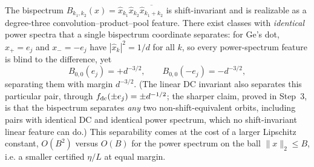 \begin{proposition}
\label{prop:bispectrum}
The bispectrum $B_{k_1,k_2}(x) = \hat x_{k_1}\hat x_{k_2}\overline{\hat x_{k_1+k_2}}$ is
shift-invariant and is realizable as a degree-three convolution--product--pool feature. There exist
classes with \emph{identical} power spectra that a single bispectrum coordinate separates: for Ge's
dot, $x_+ = e_j$ and $x_- = -e_j$ have $|\hat x_k|^2 = 1/d$ for all $k$, so every power-spectrum
feature is blind to the difference, yet
\[
B_{0,0}(e_j) = +d^{-3/2}, \qquad B_{0,0}(-e_j) = -d^{-3/2},
\]
separating them with margin $d^{-3/2}$. (The linear DC invariant also separates this particular pair,
through $f_{\mathrm{dc}}(\pm e_j) = \pm d^{-1/2}$; the sharper claim, proved in Step~3, is that the bispectrum
separates \emph{any} two non-shift-equivalent orbits, including pairs with identical DC and identical
power spectrum, which no shift-invariant linear feature can do.) This separability comes at the cost
of a larger Lipschitz constant, $O(B^2)$ versus $O(B)$ for the power spectrum on the ball
$\|x\|_2 \le B$, i.e. a smaller certified $\eta/L$ at equal margin.
\end{proposition}

